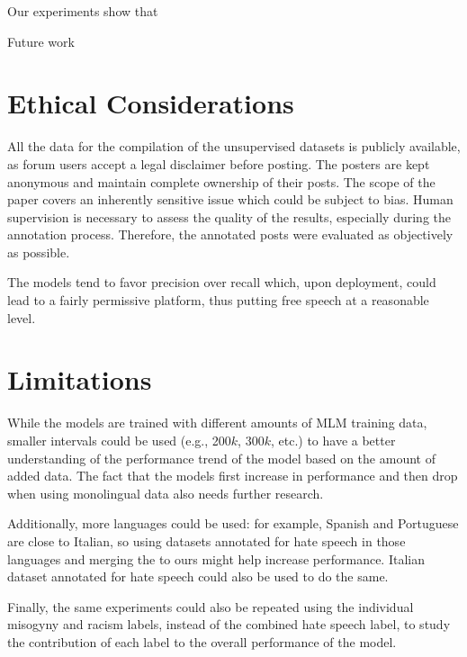 \documentclass[11pt]{article}
\begin{document}
Our experiments show that 

Future work 

\section*{Ethical Considerations}
All the data for the compilation of the unsupervised datasets is publicly available, as forum users accept a legal disclaimer before posting. The posters are kept anonymous and maintain complete ownership of their posts. 
% 
The scope of the paper covers an inherently sensitive issue which could be subject to bias. Human supervision is necessary to assess the quality of the results, especially during the annotation process. Therefore, the annotated posts were evaluated as objectively as possible.

The models tend to favor precision over recall which, upon deployment, 
could lead to a fairly permissive platform, thus putting free speech 
at a reasonable level.

\section*{Limitations}

While the models are trained with different amounts of MLM training data, smaller intervals could be used (e.g., 200$k$, 300$k$, etc.) to have a better understanding of the performance trend of the model based on the amount of added data. The fact that the models first increase in performance and then drop when using monolingual data also needs further research.

Additionally, more languages could be used: for example, Spanish and Portuguese are close to Italian, so using datasets annotated for hate speech in those languages and merging the to ours might help increase performance. Italian dataset annotated for hate speech could also be used to do the same.


Finally, the same experiments could also be repeated using the individual misogyny and racism labels, instead of the combined hate speech label, to study the contribution of each label to the overall performance of the model.



\end{document}
